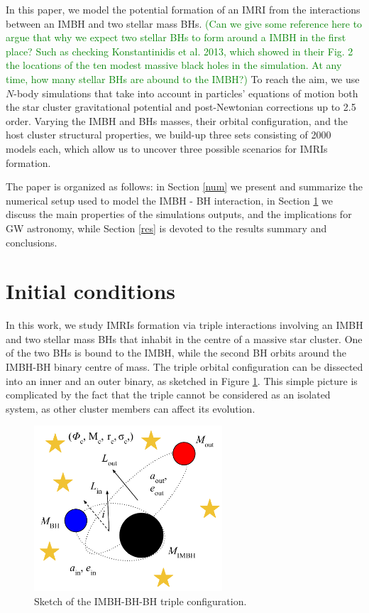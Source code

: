 \documentclass[twocolumn]{aastex62}
\newcommand{\xian}{\textcolor{green}}
\begin{document}
In this paper, we model the potential formation of an IMRI from the
interactions between an IMBH and two stellar mass BHs.  \xian{(Can we give some
reference here to argue that why we expect two stellar BHs to form around a
IMBH in the first place? Such as checking Konstantinidis et al. 2013, which
showed in their Fig. 2 the locations of the ten modest massive black holes in
the simulation.  At any time, how many stellar BHs are abound to the IMBH?)} To
reach the aim, we use $N$-body simulations that take into account in particles'
equations of motion both the star cluster gravitational potential and
post-Newtonian corrections up to 2.5 order. Varying the IMBH and BHs masses,
their orbital configuration, and the host cluster structural properties, we
build-up three sets consisting of 2000 models each, which allow us to uncover
three possible scenarios for IMRIs formation. 

The paper is organized as follows: in Section \ref{num} we present and
summarize the numerical setup used to model the IMBH - BH interaction, in
Section \ref{met} we discuss the main properties of the simulations outputs,
and the implications for GW astronomy, while Section \ref{res} is devoted to
the results summary and conclusions. 


\section{Initial conditions} \label{met}

In this work, we study IMRIs formation via triple interactions involving an
IMBH and two stellar mass BHs that inhabit in the centre of a massive star
cluster.  One of the two BHs is bound to the IMBH, while the second BH orbits
around the IMBH-BH binary centre of mass. The triple orbital configuration can
be dissected into an inner and an outer binary, as sketched in Figure
\ref{fig:f1}. This simple picture is complicated by the fact that the triple
cannot be considered as an isolated system, as other cluster members can affect
its evolution.

\begin{figure}
    \centering
    \includegraphics[width=7cm]{triple}
    \caption{Sketch of the IMBH-BH-BH triple configuration.}
    \label{fig:f1}
\end{figure}
\end{document}

